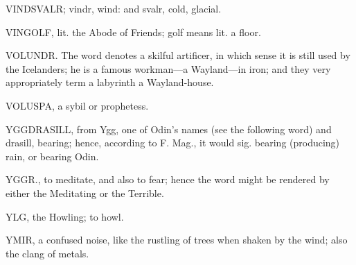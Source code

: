 VINDSVALR; vindr, wind: and svalr, cold, glacial.

VINGOLF, lit. the Abode of Friends; golf means lit. a floor.

VOLUNDR. The word denotes a skilful artificer, in which sense it is
still used by the Icelanders; he is a famous workman—a Wayland—in
iron; and they very appropriately term a labyrinth a Wayland-house.

VOLUSPA, a sybil or prophetess.

YGGDRASILL, from Ygg, one of Odin's names (see the following word) and
drasill, bearing; hence, according to F. Mag., it would sig. bearing
(producing) rain, or bearing Odin.

YGGR., to meditate, and also to fear; hence the word might be rendered
by either the Meditating or the Terrible.

YLG, the Howling; to howl.

YMIR, a confused noise, like the rustling of trees when shaken by the
wind; also the clang of metals.
